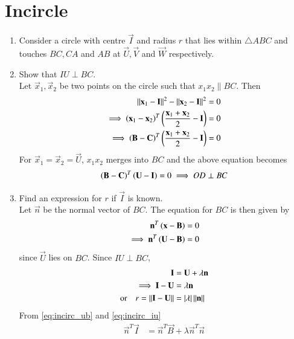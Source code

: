 \documentclass[journal,12pt,twocolumn]{IEEEtran}
\renewcommand\thesection{\arabic{section}}
\begin{document}
\section{Incircle}
%
\begin{enumerate}[label=\thesection.\arabic*
,ref=\thesection.\theenumi]

\item Consider a circle with centre $\vec{I}$ and radius $r$ that lies within $\triangle ABC$ and touches 
$BC, CA$ and $AB$ at $\vec{U}, \vec{V}$ and $\vec{W}$ respectively.

\item Show that $IU \perp BC$.
\\
\solution Let $\vec{x}_1,\vec{x}_2$ be two points on the circle such that 
$x_1x_2 \parallel BC$. Then
%
\begin{align}
\lVert\mathbf{x}_1-\mathbf{I}\rVert^2- 
\lVert\mathbf{x}_2-\mathbf{I}\rVert^2 &= 0 
\\
\implies 
\left(\mathbf{x}_1-\mathbf{x}_2\right)^T\left(\frac{\mathbf{x}_1+\mathbf{x}_2}{2}-\mathbf{I}\right) &= 
0 
\\
\implies 
\left(\mathbf{B}-\mathbf{C}\right)^T\left(\frac{\mathbf{x}_1+\mathbf{x}_2}{2}-\mathbf{I}\right) &= 
0 
\end{align}
%
For $\vec{x}_1=\vec{x}_2=\vec{U}$, $x_1x_2$ merges into $BC$ and the above 
equation becomes 
%
\begin{align}
\left(\mathbf{B}-\mathbf{C}\right)^T\left(\mathbf{U}-\mathbf{I}\right) = 
0 
\implies OD \perp BC
\end{align}
\item Find an expression for $r$ if $\vec{I}$ is known.
\\
\solution Let $\vec{n}$ be the normal vector of $BC$.  The equation for $BC$ is then given by
\begin{align}
\mathbf{n}^T\left(\mathbf{x}-\mathbf{B}\right) &= 0
\\
\implies \mathbf{n}^T\left(\mathbf{U}-\mathbf{B}\right) &= 0
\label{eq:incirc_ub}
\end{align}
since $\vec{U}$ lies on $BC$.
Since $IU \perp BC$, 
\begin{align}
\label{eq:incirc_iu}
\mathbf{I}&=\mathbf{U}+\lambda\mathbf{n}
\\
\implies \mathbf{I}-\mathbf{U}&=\lambda\mathbf{n}
\\
\text{or}\quad r=\lVert\mathbf{I}-\mathbf{U}\rVert&=\left\vert\lambda\right\vert\lVert\mathbf{n}\rVert
\label{eq:incirc_r}
\end{align}
From \eqref{eq:incirc_ub} and \eqref{eq:incirc_iu}
\begin{align}
\vec{n}^T\vec{I}&=\vec{n}^T\vec{B}+\lambda\vec{n}^T\vec{n}

\end{align}
\end{enumerate}
\end{document}
